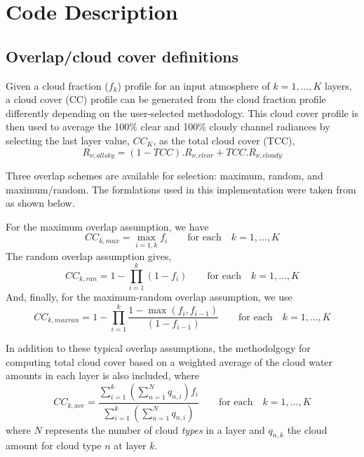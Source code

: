 \section{Code Description}
\label{sec:code_description}

\subsection{Overlap/cloud cover definitions}

Given a cloud fraction ($f_k$) profile for an input atmosphere of $k = 1,\ldots,K$ layers, a cloud cover (CC) profile can be generated from the cloud fraction profile differently depending on the user-selected methodology. This cloud cover profile is then used to average the 100\% clear and 100\% cloudy channel radiances by selecting the last layer value, $CC_K$, as the total cloud cover (TCC),
\begin{equation}
  R_{\nu,allsky} = (1 - TCC).R_{\nu,clear} + TCC.R_{\nu,cloudy}
\end{equation}

Three overlap schemes are available for selection: maximum, random, and maximum/random. The formlations used in this implementation were taken from \citet{MorcretteJakob_2000} as shown below.

For the maximum overlap assumption, we have
\begin{equation}
  CC_{k,max} = \max_{i=1,k}f_{i}\qquad\mbox{for each}\quad k = 1,\ldots,K
  \label{eqn:maximum_cc}
\end{equation}
The random overlap assumption gives,
\begin{equation}
  CC_{k,ran} = 1 - \prod_{i=1}^k{(1 - f_{i})}\qquad\mbox{for each}\quad k = 1,\ldots,K
  \label{eqn:random_cc}
\end{equation}
And, finally, for the maximum-random overlap assumption, we use
\begin{equation}
  CC_{k,maxran} = 1 - \prod_{i=1}^k{\frac{1 - \max(f_i,f_{i-1})}{(1 - f_{i-1})}}\qquad\mbox{for each}\quad k = 1,\ldots,K
  \label{eqn:maxran_cc}
\end{equation}

In addition to these typical overlap assumptions, the methodolgogy for computing total cloud cover based on a weighted average of the cloud water amounts in each layer \citep{Geer_2009} is also included, where
\begin{equation}
  CC_{k,ave} = \frac{\displaystyle \sum_{i=1}^k{\left( \textstyle \sum_{n=1}^N{q_{n,i}} \right) f_i}}{\displaystyle \sum_{i=1}^k{\left( \textstyle \sum_{n=1}^N{q_{n,i}} \right)}}\qquad\mbox{for each}\quad k = 1,\ldots,K
  \label{eqn:average_cc}
\end{equation}
where $N$ represents the number of cloud \emph{types} in a layer and $q_{n,k}$ the cloud amount for cloud type $n$ at layer $k$.

